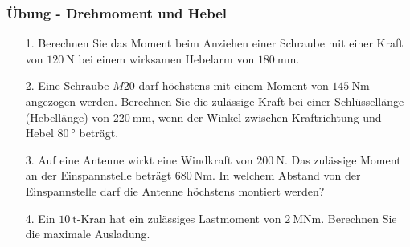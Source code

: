 \documentclass{beamer}
\begin{document}
\frame
{
\frametitle{Übung - \textbf{Drehmoment} und Hebel}
\begin{enumerate}
\item[1.] Berechnen Sie das Moment beim Anziehen einer Schraube mit einer Kraft von $\SI{120}{\newton}$ bei einem wirksamen Hebelarm von $\SI{180}{\milli\meter}$.
\item[2.] Eine Schraube $M20$ darf höchstens mit einem Moment von $\SI{145}{\newton\meter}$ angezogen werden. Berechnen Sie die zulässige Kraft bei einer Schlüssellänge (Hebellänge) von $\SI{220}{\milli\meter}$, wenn der Winkel zwischen Kraftrichtung und Hebel $\SI{80}{\degree}$ beträgt.
\item[3.] Auf eine Antenne wirkt eine Windkraft von $\SI{200}{\newton}$. Das zulässige Moment an der Einspannstelle beträgt $\SI{680}{\newton\meter}$. In welchem Abstand von der Einspannstelle darf die Antenne höchstens montiert werden?
\item[4.] Ein $\SI{10}{\tonne}$-Kran hat ein zulässiges Lastmoment von $\SI{2}{\mega\newton\meter}$. Berechnen Sie die maximale Ausladung.
\end{enumerate}
}

\end{document}
